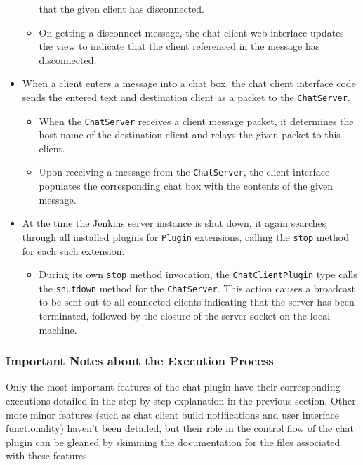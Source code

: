 \documentclass{article}
\newcommand{\classname}[1] {\texttt{#1}}
\newcommand{\methodname}[1] {\texttt{#1}}
\begin{document}
\begin{itemize}
\begin{itemize}
					that the given client has disconnected.
					\item On getting a disconnect message, the chat client web
					interface updates the view to indicate that the client
					referenced in the message has disconnected.
				\end{itemize}
				\item When a client enters a message into a chat box, the chat
				client interface code sends the entered text and destination
				client as a packet to the \classname{ChatServer}.
				\begin{itemize}
					\item When the \classname{ChatServer} receives a client
					message packet, it determines the host name of the destination
					client and relays the given packet to this client.
					\item Upon receiving a message from the \classname{ChatServer},
					the client interface populates the corresponding chat box
					with the contents of the given message.
				\end{itemize}
				\item At the time the Jenkins server instance is shut down, it again
				searches through all installed plugins for \classname{Plugin}
				extensions, calling the \methodname{stop} method for each such
				extension.
				\begin{itemize}
					\item During its own \methodname{stop} method invocation, the
					\classname{ChatClientPlugin} type calls the \methodname{shutdown}
					method for the \classname{ChatServer}.  This action causes a
					broadcast to be sent out to all connected clients indicating
					that the server has been terminated, followed by the closure
					of the server socket on the local machine.
				\end{itemize}
			\end{itemize}

			\subsubsection[Notes about Execution]{Important Notes about the Execution Process}
			Only the most important features of the chat plugin have their
			corresponding executions detailed in the step-by-step explanation
			in the previous section.  Other more minor features (such as
			chat client build notifications and user interface functionality)
			haven't been detailed, but their role in the control flow of the
			chat plugin can be gleaned by skimming the documentation for
			the files associated with these features.  
			
\end{document}

